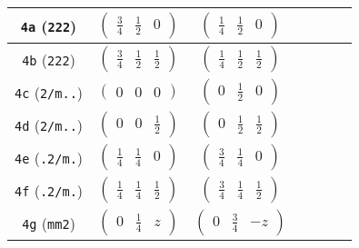 \documentclass[fleqn,9pt,landscape]{jsarticle}
\begin{document}
\begin{center}
\begin{longtable}{ccccccc}
{\tt 4a} ({\tt 222}) & $ \begin{pmatrix} \frac{3}{4} & \frac{1}{2} & 0 \end{pmatrix} $ & $ \begin{pmatrix} \frac{1}{4} & \frac{1}{2} & 0 \end{pmatrix} $ & $  $ & $  $ & $  $ & $  $ \\ \hline
{\tt 4b} ({\tt 222}) & $ \begin{pmatrix} \frac{3}{4} & \frac{1}{2} & \frac{1}{2} \end{pmatrix} $ & $ \begin{pmatrix} \frac{1}{4} & \frac{1}{2} & \frac{1}{2} \end{pmatrix} $ & $  $ & $  $ & $  $ & $  $ \\ \hline
{\tt 4c} ({\tt 2/m..}) & $ \begin{pmatrix} 0 & 0 & 0 \end{pmatrix} $ & $ \begin{pmatrix} 0 & \frac{1}{2} & 0 \end{pmatrix} $ & $  $ & $  $ & $  $ & $  $ \\ \hline
{\tt 4d} ({\tt 2/m..}) & $ \begin{pmatrix} 0 & 0 & \frac{1}{2} \end{pmatrix} $ & $ \begin{pmatrix} 0 & \frac{1}{2} & \frac{1}{2} \end{pmatrix} $ & $  $ & $  $ & $  $ & $  $ \\ \hline
{\tt 4e} ({\tt .2/m.}) & $ \begin{pmatrix} \frac{1}{4} & \frac{1}{4} & 0 \end{pmatrix} $ & $ \begin{pmatrix} \frac{3}{4} & \frac{1}{4} & 0 \end{pmatrix} $ & $  $ & $  $ & $  $ & $  $ \\ \hline
{\tt 4f} ({\tt .2/m.}) & $ \begin{pmatrix} \frac{1}{4} & \frac{1}{4} & \frac{1}{2} \end{pmatrix} $ & $ \begin{pmatrix} \frac{3}{4} & \frac{1}{4} & \frac{1}{2} \end{pmatrix} $ & $  $ & $  $ & $  $ & $  $ \\ \hline
{\tt 4g} ({\tt mm2}) & $ \begin{pmatrix} 0 & \frac{1}{4} & z \end{pmatrix} $ & $ \begin{pmatrix} 0 & \frac{3}{4} & - z \end{pmatrix} $ & $  $ & $  $ & $  $ & $  $ \\ \hline

\end{longtable}
\end{center}
\end{document}
